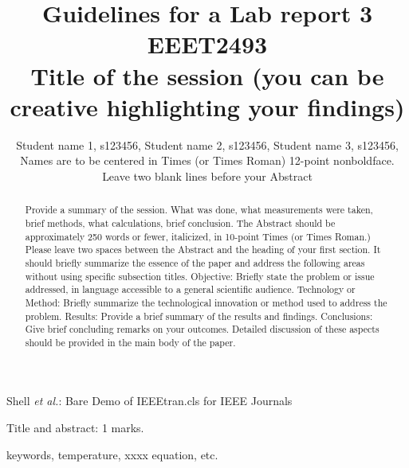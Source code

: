 \documentclass[journal]{IEEEtran}
\begin{document}
\title{Guidelines for a Lab report 3 EEET2493 \\
\small{Title of the session (you can be creative highlighting your findings)}}

\author{Student name 1, s123456,
        Student name 2, s123456,
        Student name 3, s123456,
        {\small Names are to be centered in Times 
(or Times Roman) 12-point nonboldface. Leave two blank lines before your Abstract}}%
        
{Shell \MakeLowercase{\textit{et al.}}: Bare Demo of IEEEtran.cls for IEEE Journals}

\maketitle

\begin{flushright} Title and abstract: 1 marks. \end{flushright}
\begin{abstract} Provide a summary of the session. What was done, 
what measurements were taken, brief methods, what calculations, brief conclusion.  The Abstract should be approximately 250 words or fewer, italicized, in 10-point Times (or Times Roman.) Please leave two spaces between the Abstract and the heading of your first section.
It should briefly summarize the essence of the paper and address the following areas without using specific subsection titles. Objective: Briefly state the problem or issue addressed, in language accessible to a general scientific audience. Technology or Method: Briefly summarize the technological innovation or method used to address the problem. Results: Provide a brief summary of the results and findings. Conclusions: Give brief concluding remarks on your outcomes. Detailed discussion of these aspects should be provided in the main body of the paper. 
\end{abstract}

\begin{IEEEkeywords}
keywords, temperature, xxxx equation, etc.
\end{IEEEkeywords}
\end{document}
